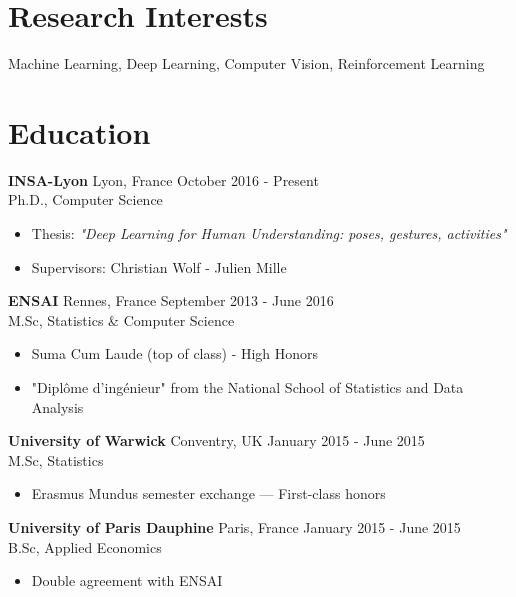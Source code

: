 \documentclass[10pt]{res} %
\begin{document}
\begin{resume}

 
\section{\large Research Interests}  
Machine Learning, Deep Learning, Computer Vision, Reinforcement Learning


\section{\large Education}
\textbf{INSA-Lyon} \hfill Lyon, France \hfill October 2016 - Present \\
Ph.D., Computer Science
\begin{itemize}
\item  Thesis: {\sl "Deep Learning for Human Understanding: poses, gestures, activities"}
\item  Supervisors: Christian Wolf - Julien Mille
\end{itemize}


\textbf{ENSAI} \hfill Rennes, France \hfill September 2013 - June 2016 \\
M.Sc, Statistics \& Computer Science
\begin{itemize}
\item Suma Cum Laude (top of class) - High Honors
\item "Diplôme d'ingénieur" from the National School of Statistics and Data Analysis
\end{itemize}

\textbf{University of Warwick} \hfill Conventry, UK \hfill January 2015 - June 2015 \\
M.Sc, Statistics
\begin{itemize}
\item Erasmus Mundus semester exchange --- First-class honors
\end{itemize}

\textbf{University of Paris Dauphine} \hfill Paris, France \hfill January 2015 - June 2015 \\
B.Sc, Applied Economics
\begin{itemize}
\item Double agreement with ENSAI
\end{itemize}


\end{resume}
\end{document}
